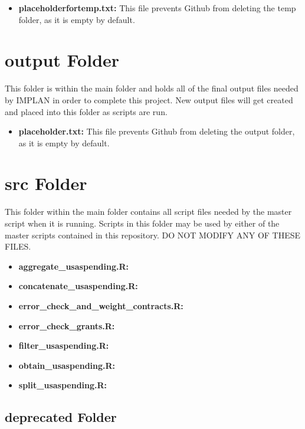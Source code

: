 \documentclass[
]{book}
\providecommand{\tightlist}{%
  \setlength{\itemsep}{0pt}\setlength{\parskip}{0pt}}
\begin{document}
\begin{itemize}
\tightlist
\item
  \textbf{placeholderfortemp.txt:} This file prevents Github from deleting the temp folder, as it is empty by default.
\end{itemize}

\hypertarget{output-folder}{%
\section{output Folder}\label{output-folder}}

This folder is within the main folder and holds all of the final output files needed by IMPLAN in order to complete this project. New output files will get created and placed into this folder as scripts are run.

\begin{itemize}
\tightlist
\item
  \textbf{placeholder.txt:} This file prevents Github from deleting the output folder, as it is empty by default.
\end{itemize}

\hypertarget{src-folder}{%
\section{src Folder}\label{src-folder}}

This folder within the main folder contains all script files needed by the master script when it is running. Scripts in this folder may be used by either of the master scripts contained in this repository. DO NOT MODIFY ANY OF THESE FILES.

\begin{itemize}
\tightlist
\item
  \textbf{aggregate\_usaspending.R:}
\item
  \textbf{concatenate\_usaspending.R:}
\item
  \textbf{error\_check\_and\_weight\_contracts.R:}
\item
  \textbf{error\_check\_grants.R:}
\item
  \textbf{filter\_usaspending.R:}
\item
  \textbf{obtain\_usaspending.R:}
\item
  \textbf{split\_usaspending.R:}
\end{itemize}

\hypertarget{deprecated-folder-1}{%
\subsection{deprecated Folder}\label{deprecated-folder-1}}
\end{document}
